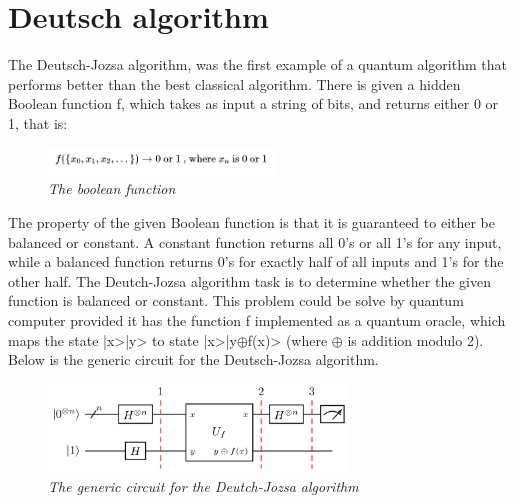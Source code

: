 \documentclass{article}
\begin{document}
\section{Deutsch algorithm}
The Deutsch-Jozsa algorithm, was the first example of a quantum algorithm that performs better than the best classical algorithm. 
There is given a hidden Boolean function f, which takes as input a string of bits, and returns either 0 or 1, that is:
\begin{figure}[h]
\begin{center}
\begin{minipage}[b]{4cm}
\centering
\includegraphics[width=6cm]{deutch_boolean.png}\\\textit{The boolean function}
\end{minipage}
\end{center}
\end{figure}
\newline
The property of the given Boolean function is that it is guaranteed to either be balanced or constant. A constant function returns all 0's or all 1's for any input, while a balanced function returns 0's for exactly half of all inputs and 1's for the other half. 
The Deutch-Jozsa algorithm task is to determine whether the given function is balanced or constant.
This problem could be solve by quantum computer provided it has the function f implemented as a quantum oracle, which maps the state |x>|y> to state |x>|y$\oplus$f(x)> (where $\oplus$ is addition modulo 2).
\newline Below is the generic circuit for the Deutsch-Jozsa algorithm.
\begin{figure}[h]
\begin{center}
\begin{minipage}[b]{4cm}
\centering
\includegraphics[width=8cm]{deutch_schema.png}\\\textit{The generic circuit for the Deutch-Jozsa algorithm}
\end{minipage}
\end{center}
\end{figure}
\newline
\end{document}
